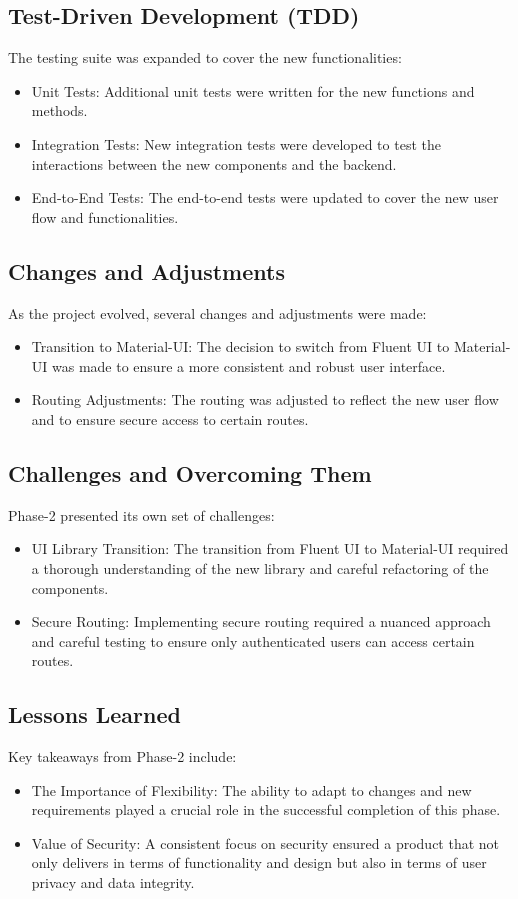 \documentclass[11pt]{article}
\begin{document}
\subsection{Test-Driven Development (TDD)}
\label{sec:orgc219fc2}
The testing suite was expanded to cover the new functionalities:
\begin{itemize}
\item Unit Tests: Additional unit tests were written for the new functions and
methods.
\item Integration Tests: New integration tests were developed to test the
interactions between the new components and the backend.
\item End-to-End Tests: The end-to-end tests were updated to cover the new user
flow and functionalities.
\end{itemize}

\subsection{Changes and Adjustments}
\label{sec:org45d9a6e}
As the project evolved, several changes and adjustments were made:
\begin{itemize}
\item Transition to Material-UI: The decision to switch from Fluent UI to
Material-UI was made to ensure a more consistent and robust user
interface.
\item Routing Adjustments: The routing was adjusted to reflect the new user flow
and to ensure secure access to certain routes.
\end{itemize}

\subsection{Challenges and Overcoming Them}
\label{sec:org2fff939}
Phase-2 presented its own set of challenges:
\begin{itemize}
\item UI Library Transition: The transition from Fluent UI to Material-UI
required a thorough understanding of the new library and careful
refactoring of the components.
\item Secure Routing: Implementing secure routing required a nuanced approach
and careful testing to ensure only authenticated users can access certain
routes.
\end{itemize}

\subsection{Lessons Learned}
\label{sec:orga536c54}
Key takeaways from Phase-2 include:
\begin{itemize}
\item The Importance of Flexibility: The ability to adapt to changes and new
requirements played a crucial role in the successful completion of this
phase.
\item Value of Security: A consistent focus on security ensured a product that
not only delivers in terms of functionality and design but also in terms
of user privacy and data integrity.
\end{itemize}
\end{document}
